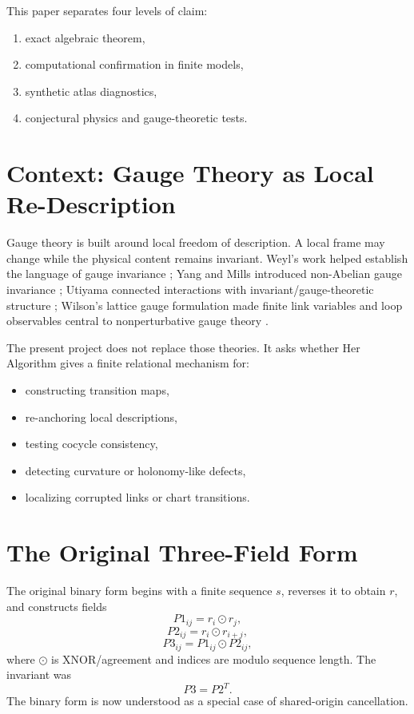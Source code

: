 \documentclass[11pt]{article}
\newcommand{\HA}{Her Algorithm}
\begin{document}
This paper separates four levels of claim:
\begin{enumerate}[leftmargin=1.5em]
\item exact algebraic theorem,
\item computational confirmation in finite models,
\item synthetic atlas diagnostics,
\item conjectural physics and gauge-theoretic tests.
\end{enumerate}

\section{Context: Gauge Theory as Local Re-Description}

Gauge theory is built around local freedom of description. A local frame may change while the physical content remains invariant. Weyl's work helped establish the language of gauge invariance \cite{weyl1929gravitation}; Yang and Mills introduced non-Abelian gauge invariance \cite{yangmills1954}; Utiyama connected interactions with invariant/gauge-theoretic structure \cite{utiyama1956}; Wilson's lattice gauge formulation made finite link variables and loop observables central to nonperturbative gauge theory \cite{wilson1974}.

The present project does not replace those theories. It asks whether \HA{} gives a finite relational mechanism for:
\begin{itemize}[leftmargin=1.5em]
\item constructing transition maps,
\item re-anchoring local descriptions,
\item testing cocycle consistency,
\item detecting curvature or holonomy-like defects,
\item localizing corrupted links or chart transitions.
\end{itemize}

\section{The Original Three-Field Form}

The original binary form begins with a finite sequence \(s\), reverses it to obtain \(r\), and constructs fields
\[
P1_{ij}=r_i\odot r_j,
\]
\[
P2_{ij}=r_i\odot r_{i+j},
\]
\[
P3_{ij}=P1_{ij}\odot P2_{ij},
\]
where \(\odot\) is XNOR/agreement and indices are modulo sequence length. The invariant was
\[
\boxed{P3=P2^T.}
\]
The binary form is now understood as a special case of shared-origin cancellation.
\end{document}
